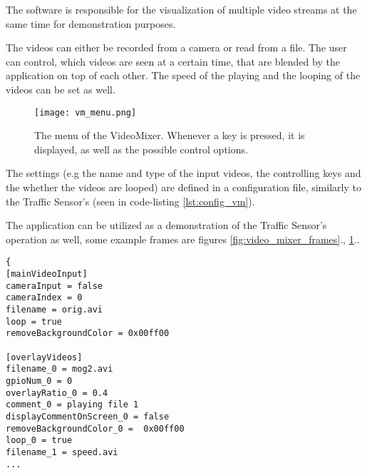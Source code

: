 The software is responsible for the visualization of multiple video streams at the same time for demonstration purposes.

The videos can either be recorded from a camera or read from a file.
The user can control, which videos are seen at a certain time, that are blended by the application on top of each other.
The speed of the playing and the looping of the videos can be set as well.

\begin{figure}[!h]
	\centering
	\texttt{[image: vm\_menu.png]}
	
	\caption{The menu of the VideoMixer. Whenever a key is pressed, it is displayed, as well as the possible control options. \label{fig:video_mixer_menu}}
\end{figure}

The settings (e.g the name and type of the input videos, the controlling keys and the whether the videos are looped) are defined in a configuration file, similarly to the Traffic Sensor's (seen in code-listing \ref{lst:config_vm}).

The application can be utilized as a demonstration of the Traffic Sensor's operation as well, some example frames are figures \ref{fig:video_mixer_frames}., \ref{fig:video_mixer_menu}..

\begin{lstlisting}[frame=single,float=!ht,caption={Part of a configuration file for the VideoMixer application. The file sets parameters for the main input video (section [mainVideoInput]), and the overlay videos (section [overlayVideos]), that are blended on top. The file defines whether the video is read from a camera or a file, whether some parts of the background are removed, and other adjustments, like the comment displayed on the screen, when a video starts playing.},label=lst:config_vm]
{
[mainVideoInput]
cameraInput = false
cameraIndex = 0
filename = orig.avi
loop = true
removeBackgroundColor = 0x00ff00

[overlayVideos]
filename_0 = mog2.avi
gpioNum_0 = 0
overlayRatio_0 = 0.4
comment_0 = playing file 1
displayCommentOnScreen_0 = false
removeBackgroundColor_0 =  0x00ff00
loop_0 = true
filename_1 = speed.avi
...
\end{lstlisting}

